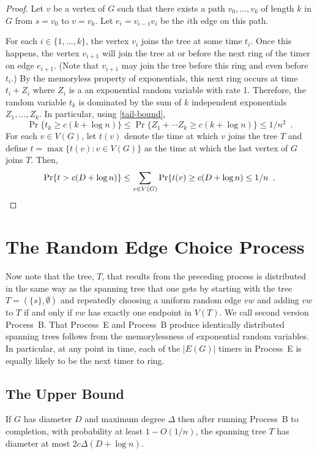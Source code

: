 \documentclass{patmorin}
\begin{document}
\begin{proof}
  Let $v$ be a vertex of $G$ such that there exists a path
  $v_0,\ldots,v_k$ of length $k$ in $G$ from $s=v_0$ to $v=v_k$.
  Let $e_i=v_{i-1}v_i$ be the $i$th edge on this path.

  For each $i\in\{1,\ldots,k\}$, the vertex $v_i$ joins the tree at some
  time $t_i$.  Once this happens, the vertex $v_{i+1}$ will join the tree
  at or before the next ring of the timer on edge $e_{i+1}$.  (Note that
  $v_{i+1}$ may join the tree before this ring and even before $t_i$.)
  By the memoryless property of exponentials, this next ring occurs at
  time $t_i+Z_i$ where $Z_i$ is a an exponential random variable with
  rate 1.  Therefore, the random variable $t_k$ is dominated by the sum
  of $k$ independent exponentials $Z_1,\ldots,Z_k$.
  In particular, using \eqref{tail-bound},
  \[
      \Pr\{t_k\ge c(k+\log n)\} \le \Pr\{Z_1+\cdots Z_k\ge c(k+\log n)\} \le 1/n^2 \enspace .
  \]
  For each $v\in V(G)$, let $t(v)$ denote the time at which $v$ joins
  the tree $T$ and define $t=\max\{t(v):v\in V(G)\}$
  as the time at which the last vertex of $G$ joins 
  $T$.  Then,
  \[
      \Pr\{t> c(D+\log n)\} \le \sum_{v\in V(G)}\Pr\{t(v) \ge c(D+\log n)     
       \le 1/n \enspace . \qedhere
  \]
\end{proof}

\section{The Random Edge Choice Process}

Now note that the tree, $T$, that results from the preceding process
is distributed in the same way as the spanning tree that one gets by
starting with the tree $T=(\{s\},\emptyset)$ and repeatedly choosing
a uniform random edge $vw$ and adding $vw$ to $T$ if and only if $vw$
has exactly one endpoint in $V(T)$.  We call second version Process~B.
That Process~E and Process~B produce identically distributed spanning
trees follows from the memorylessness of exponential random variables.
In particular, at any point in time, each of the $|E(G)|$ timers in
Process~E is equally likely to be the next timer to ring.

\subsection{The Upper Bound}

\begin{lem}
  If $G$ has diameter $D$ and maximum degree $\Delta$ then after running
  Process~B to completion, with probability at least $1-O(1/n)$, the spanning
  tree $T$ has diameter at most $2c\Delta(D+\log n)$.
\end{lem}
\end{document}
